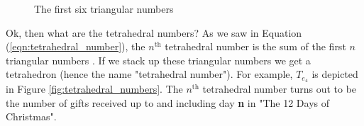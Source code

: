 \documentclass{article}
\theoremstyle{definition}
\begin{document}
  
\vspace{1.0em}
\begin{figure}[H]
  \caption{The first six triangular numbers}
  \label{fig:triangular_numbers}
\end{figure}


\vspace{1.0em}
\noindent
Ok, then what are the tetrahedral numbers? As we saw in Equation
(\ref{eqn:tetrahedral_number}), the $n^{\text{th}}$ tetrahedral
number is the sum of the first $n$ triangular numbers
\cite{wolfram:tetrahedral_numbers}. If we stack up these
triangular numbers we get a tetrahedron (hence the name
"tetrahedral number"). For example, $T_{e_{4}}$ is depicted in
Figure \ref{fig:tetrahedral_numbers}. The $n^{\text{th}}$
tetrahedral number turns out to be the number of gifts received
up to and including day {\bf n} in "The 12 Days of Christmas".
\end{document}

